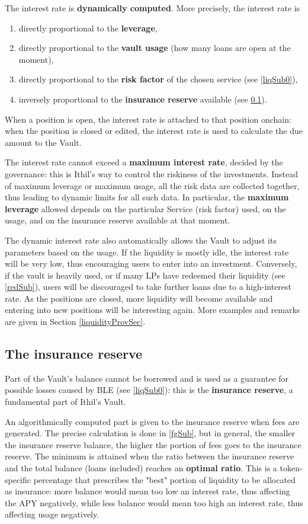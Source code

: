 \documentclass[a4paper,10 pt]{article}
\theoremstyle{definition}
\begin{document}
The interest rate is {\bf dynamically computed}. More precisely, the interest rate is
\begin{enumerate} 
\item directly proportional to the {\bf leverage}, 
\item directly proportional to the {\bf vault usage} (how many loans are open at the moment), 
\item directly proportional to the {\bf risk factor} of the chosen service (see \ref{liqSub0}),
\item inversely proportional to the {\bf insurance reserve} available (see \ref{insResSub}).
\end{enumerate}
When a position is open, the interest rate is attached to that position onchain: when the position is closed or edited, the interest rate is used to calculate the due amount to the Vault.

The interest rate cannot exceed a {\bf maximum interest rate}, decided by the governance: this is Ithil's way to control the riskiness of the investments. Instead of maximum leverage or maximum usage, all the risk data are collected together, thus leading to dynamic limits for all such data. In particular, the {\bf maximum leverage} allowed depends on the particular Service (risk factor) used, on the usage, and on the insurance reserve available at that moment. 

The dynamic interest rate also automatically allows the Vault to adjust its parameters based on the usage. If the liquidity is mostly idle, the interest rate will be very low, thus encouraging users to enter into an investment. Conversely, if the vault is heavily used, or if many LPs have redeemed their liquidity (see \ref{redSub}), users will be discouraged to take further loans due to a high-interest rate. As the positions are closed, more liquidity will become available and entering into new positions will be interesting again. More examples and remarks are given in Section \ref{liquidityProvSec}.

\subsection{The insurance reserve}\label{insResSub}

Part of the Vault's balance cannot be borrowed and is used as a guarantee for possible losses caused by BLE (see \ref{liqSub0}): this is the {\bf insurance reserve}, a fundamental part of Ithil's Vault.

An algorithmically computed part is given to the insurance reserve when fees are generated. The precise calculation is done in \ref{fgSub}, but in general, the smaller the insurance reserve balance, the higher the portion of fees goes to the insurance reserve. The minimum is attained when the ratio between the insurance reserve and the total balance (loans included) reaches an {\bf optimal ratio}. This is a token-specific percentage that prescribes the "best" portion of liquidity to be allocated as insurance: more balance would mean too low an interest rate, thus affecting the APY negatively, while less balance would mean too high an interest rate, thus affecting usage negatively.
\end{document}
